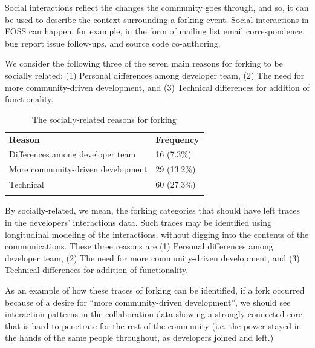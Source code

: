 \documentclass[11pt]{report}
\begin{document}
Social interactions reflect the changes the community goes through, and so, it can be used to describe the context surrounding a forking event. Social interactions in FOSS can happen, for example, in the form of mailing list email correspondence, bug report issue follow-ups, and source code co-authoring. 

We consider the following three of the seven main reasons for forking \cite{Robles} to be socially related: (1) Personal differences among developer team, (2) The need for more community-driven development, and (3) Technical differences for addition of functionality. 

\begin{table}[!ht]
\centering
\caption[The socially-related forking reasons]{The socially-related reasons for forking }
\label{tableReasonsForForkingSociallyRelated}
\begin{tabular}{p{} p{}}
\hline\noalign{\smallskip}
\textbf{Reason} & \textbf{Frequency} \\
\noalign{\smallskip}\hline\noalign{\smallskip}
Differences among developer team &  16 (7.3\%)  \\ \hline
More community-driven development & 29 (13.2\%) \\ \hline
Technical & 60 (27.3\%)\\ 
\noalign{\smallskip}\hline
\end{tabular}
\end{table}

By socially-related, we mean, the forking categories that should have left traces in the developers' interactions data. Such traces may be identified using longitudinal modeling of the interactions, without digging into the contents of the communications. These three reasons are (1) Personal differences among developer team, (2) The need for more community-driven development, and (3) Technical differences for addition of functionality. 


As an example of how these traces of forking can be identified, if a fork occurred because of a desire for ``more community-driven development'', we should see interaction patterns in the collaboration data showing a strongly-connected core that is hard to penetrate for the rest of the community (i.e. the power stayed in the hands of the same people throughout, as developers joined and left.)
\end{document}
